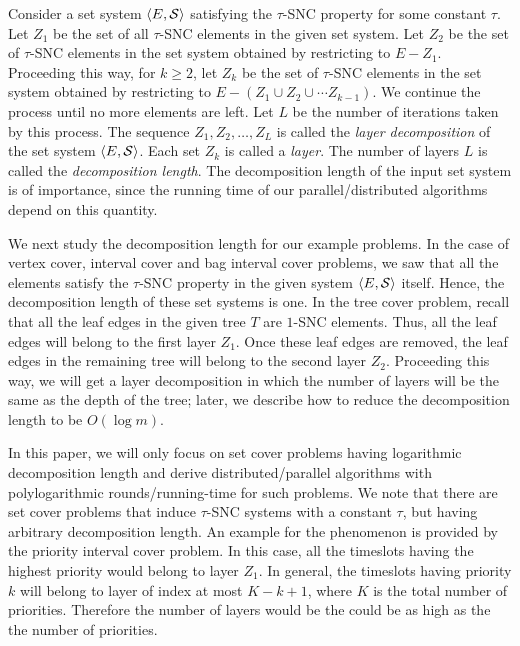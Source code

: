 \documentclass[11pt]{article}
\newcommand{\calS} {{\cal S}}
\newcommand{\pair}[2] {\langle #1, #2\rangle}
\begin{document}
Consider a set system $\pair{E}{\calS}$ satisfying the $\tau$-SNC property for some constant $\tau$.
Let $Z_1$ be the set of all $\tau$-SNC elements in the given set system.
Let $Z_2$ be the set of $\tau$-SNC elements in the set system obtained by restricting to $E-Z_1$.
Proceeding this way, for $k\geq 2$, let $Z_k$ be the set of $\tau$-SNC elements in the set system 
obtained by restricting to $E-(Z_1\cup Z_2\cup \cdots Z_{k-1})$.
We continue the process until no more elements are left.
Let $L$ be the number of iterations taken by this process.
The sequence $Z_1, Z_2, \ldots, Z_L$ is called the {\em layer decomposition} of the set system $\pair{E}{\calS}$.
Each set $Z_k$ is called a {\em layer}. The number of layers $L$ is called the {\em decomposition length}.
The decomposition length of the input set system is of importance, since the running time of our parallel/distributed
algorithms depend on this quantity.

We next study the decomposition length for our example problems.
In the case of vertex cover, interval cover and bag interval cover problems,
we saw that all the elements satisfy the $\tau$-SNC property in the given system $\pair{E}{\calS}$ itself.
Hence, the decomposition length of these set systems is one.
In the tree cover problem, recall that all the leaf edges in the given tree $T$ are $1$-SNC elements.
Thus, all the leaf edges will belong to the first layer $Z_1$. Once these leaf edges are removed,
the leaf edges in the remaining tree will belong to the second layer $Z_2$.
Proceeding this way, we will get a layer decomposition in which the number of layers will be
the same as the depth of the tree; later, we describe how to reduce the decomposition length to be $O(\log m)$.

In this paper, we will only focus on set cover problems having logarithmic decomposition length 
and derive distributed/parallel algorithms with polylogarithmic rounds/running-time for such problems.
We note that there are set cover problems that induce $\tau$-SNC systems with a constant $\tau$, 
but having arbitrary decomposition length. An example for the phenomenon is provided by the priority interval cover problem. 
In this case, all the timeslots having the highest priority would belong to layer $Z_1$.
In general, the timeslots having priority $k$ will belong to layer of index at most $K-k+1$, where $K$ is the total number of priorities.
Therefore the number of layers would be the could be as high as the the number of priorities.
\end{document}
